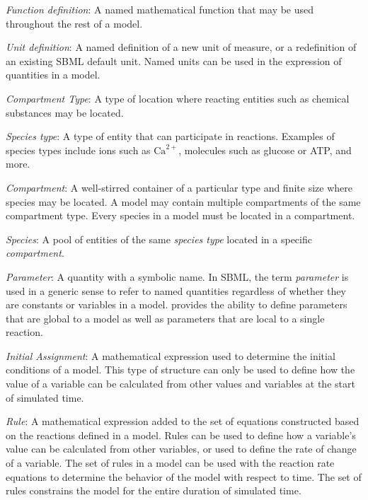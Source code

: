 \begin{description}
  
\item \emph{Function definition}: A named mathematical function
  that may be used throughout the rest of a model.

\item \emph{Unit definition}: A named definition of a new
  unit of measure, or a redefinition of an existing SBML default
  unit.  Named units can be used in the expression of quantities
  in a model.

\item \emph{Compartment Type}: A type of location where
  reacting entities such as chemical substances may be located.

\item \emph{Species type}: A type of entity
  that can participate in reactions.  Examples of species types
  include ions such as $\text{Ca}^{2+}$, molecules such as
  glucose or ATP, and more.

\item \emph{Compartment}: A well-stirred container of a
  particular type and finite size where species may be located.
  A model may contain multiple compartments of the same
  compartment type.  Every species in a model must be located in
  a compartment.

\item \emph{Species}: A pool of entities of the same
  \emph{species type} located in a specific \emph{compartment}.

\item \emph{Parameter}: A quantity with a symbolic name.
  In SBML, the term \emph{parameter} is used in a generic sense
  to refer to named quantities regardless of whether they are
  constants or variables in a model.  \sbmltwo provides the
  ability to define parameters that are global to a model as
  well as parameters that are local to a single reaction.
  
\item \emph{Initial Assignment}: A mathematical
  expression used to determine the initial conditions of a
  model.  This type of structure can only be used to define how
  the value of a variable can be calculated from other values
  and variables at the start of simulated time.
  
\item \emph{Rule}: A mathematical expression added to the set of
  equations constructed based on the reactions defined in a model.
  Rules can be used to define how a variable's value can
  be calculated from other variables, or used to define the rate
  of change of a variable.  The set of rules in a model can be
  used with the reaction rate equations to determine the
  behavior of the model with respect to time.  The set of rules
  constrains the model for the entire duration of simulated
  time.


\end{description}
